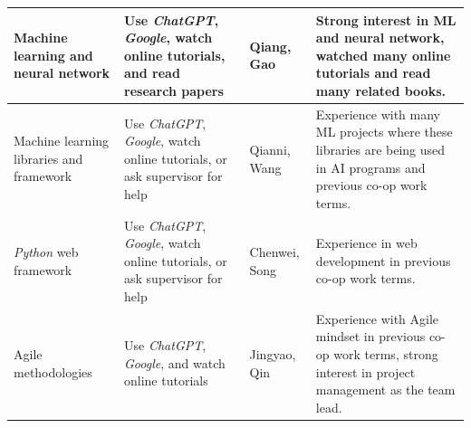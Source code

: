 \documentclass[12pt]{article}
\begin{document}
\begin{enumerate}
\begin{table}[]
\begin{tabular}{| p{3cm} | p{3.5cm} | p{2cm} | p{5cm} |}
    \hline
      \raggedright Machine learning and neural network & \raggedright Use \textit{ChatGPT}, \textit{Google}, watch online tutorials, and read research papers & Qiang, Gao & Strong interest in ML and neural network, watched many online tutorials and read many related books. \\
    \hline
      \raggedright Machine learning libraries and framework & \raggedright Use \textit{ChatGPT}, \textit{Google}, watch online tutorials, or ask supervisor for help & Qianni, Wang & Experience with many ML projects where these libraries are being used in AI programs and previous co-op work terms. \\
    \hline
      \raggedright \textit{Python} web framework & \raggedright Use \textit{ChatGPT}, \textit{Google}, watch online tutorials, or ask supervisor for help & Chenwei, Song & Experience in web development in previous co-op work terms. \\
    \hline
      \raggedright Agile methodologies & \raggedright Use \textit{ChatGPT}, \textit{Google}, and watch online tutorials & Jingyao, Qin & Experience with Agile mindset in previous co-op work terms, strong interest in project management as the team lead. \\
    \hline
    \end{tabular}
\end{table}
\end{enumerate}
\end{document}
